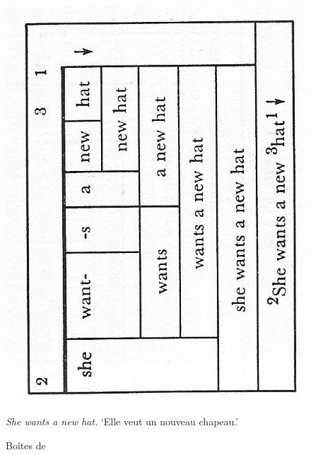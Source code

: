 {\begin{figure}
    \centering
    \includegraphics[width=\textwidth]{figures/vol1syntaxe2-img024.png}
    \caption{Boîtes de \citealt{hockett1958course}}
    \textit{She wants a new hat.} ‘Elle veut un nouveau chapeau.’
    \label{fig:hockett1}
\end{figure}
    
}
